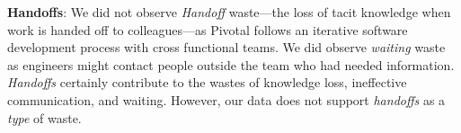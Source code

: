 

\textbf{Handoffs}: We did not observe \textit{Handoff} waste---the loss of tacit knowledge when work is handed off to colleagues---as Pivotal follows an iterative software development process with cross functional teams. We did observe \textit{waiting} waste as engineers might contact people outside the team who had needed information. \textit{Handoffs} certainly contribute to the wastes of knowledge loss, ineffective communication, and waiting. However, our data does not support \textit{handoffs} as a \textit{type} of waste.

